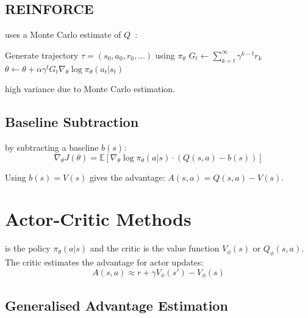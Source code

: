 \subsection{REINFORCE}

 uses a Monte Carlo estimate of $Q$~\cite{Williams1992REINFORCE}:

\begin{algorithm}[H]
\caption{REINFORCE}
\begin{algorithmic}[1]
    \State Generate trajectory $\tau = (s_0, a_0, r_0, \ldots)$ using $\pi_\theta$
        \State $G_t \gets \sum_{k=t}^\infty \gamma^{k-t} r_k$ 
        \State $\theta \gets \theta + \alpha \gamma^t G_t \nabla_\theta \log \pi_\theta(a_t|s_t)$
    \EndFor
\EndFor
\end{algorithmic}
\end{algorithm}

 high variance due to Monte Carlo estimation.

\subsection{Baseline Subtraction}

 by subtracting a baseline $b(s)$:
\begin{equation}
    \nabla_\theta J(\theta) = \mathbb{E} \left[ \nabla_\theta \log \pi_\theta(a|s) \cdot (Q(s,a) - b(s)) \right]
\end{equation}

Using $b(s) = V(s)$ gives the advantage: $A(s,a) = Q(s,a) - V(s)$.


\section{Actor-Critic Methods}


 is the policy $\pi_\theta(a|s)$ and the critic is the value function $V_\phi(s)$ or $Q_\phi(s,a)$. The critic estimates the advantage for actor updates:
\begin{equation}
    A(s,a) \approx r + \gamma V_\phi(s') - V_\phi(s)
\end{equation}

\subsection{Generalised Advantage Estimation}

